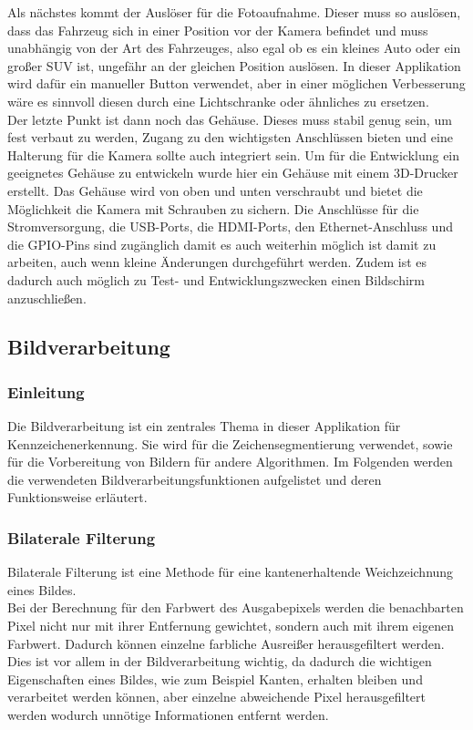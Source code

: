 Als nächstes kommt der Auslöser für die Fotoaufnahme. Dieser muss so auslösen, dass das Fahrzeug sich in einer Position vor der Kamera befindet 
und muss unabhängig von der Art des Fahrzeuges, also egal ob es ein kleines Auto oder ein großer SUV ist, ungefähr an der gleichen Position auslösen. 
In dieser Applikation wird dafür ein manueller Button verwendet, aber in einer möglichen Verbesserung wäre es sinnvoll diesen durch eine Lichtschranke oder ähnliches zu ersetzen.\\

Der letzte Punkt ist dann noch das Gehäuse. Dieses muss stabil genug sein, um fest verbaut zu werden, Zugang zu den wichtigsten Anschlüssen 
bieten und eine Halterung für die Kamera sollte auch integriert sein. Um für die Entwicklung ein geeignetes Gehäuse zu entwickeln wurde hier ein 
Gehäuse mit einem 3D-Drucker erstellt. Das Gehäuse wird von oben und unten verschraubt und bietet die Möglichkeit die Kamera mit Schrauben zu sichern. 
Die Anschlüsse für die Stromversorgung, die USB-Ports, die HDMI-Ports, den Ethernet-Anschluss und die GPIO-Pins sind zugänglich damit es auch weiterhin 
möglich ist damit zu arbeiten, auch wenn kleine Änderungen durchgeführt werden. Zudem ist es dadurch auch möglich zu Test- und Entwicklungszwecken einen Bildschirm anzuschließen.

\subsection{Bildverarbeitung}

\subsubsection{Einleitung}
Die Bildverarbeitung ist ein zentrales Thema in dieser Applikation für Kennzeichenerkennung. 
Sie wird für die Zeichensegmentierung verwendet, sowie für die Vorbereitung von Bildern für 
andere Algorithmen. Im Folgenden werden die verwendeten Bildverarbeitungsfunktionen aufgelistet 
und deren Funktionsweise erläutert.

\subsubsection{Bilaterale Filterung}
Bilaterale Filterung ist eine Methode für eine kantenerhaltende Weichzeichnung eines Bildes.\\

Bei der Berechnung für den Farbwert des Ausgabepixels werden die benachbarten Pixel nicht nur 
mit ihrer Entfernung gewichtet, sondern auch mit ihrem eigenen Farbwert. Dadurch können einzelne 
farbliche Ausreißer herausgefiltert werden. Dies ist vor allem in der Bildverarbeitung wichtig, 
da dadurch die wichtigen Eigenschaften eines Bildes, wie zum Beispiel Kanten, erhalten bleiben 
und verarbeitet werden können, aber einzelne abweichende Pixel herausgefiltert werden wodurch 
unnötige Informationen entfernt werden.\\ 

